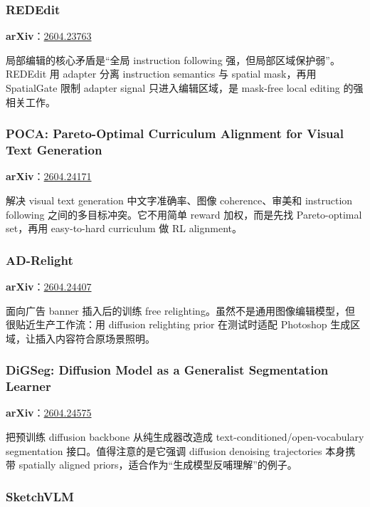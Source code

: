 \subsubsection{REDEdit}

\textbf{arXiv}：\href{https://arxiv.org/abs/2604.23763}{2604.23763}

局部编辑的核心矛盾是“全局 instruction following 强，但局部区域保护弱”。REDEdit 用 adapter 分离 instruction semantics 与 spatial mask，再用 SpatialGate 限制 adapter signal 只进入编辑区域，是 mask-free local editing 的强相关工作。

\subsubsection{POCA: Pareto-Optimal Curriculum Alignment for Visual Text Generation}

\textbf{arXiv}：\href{https://arxiv.org/abs/2604.24171}{2604.24171}

解决 visual text generation 中文字准确率、图像 coherence、审美和 instruction following 之间的多目标冲突。它不用简单 reward 加权，而是先找 Pareto-optimal set，再用 easy-to-hard curriculum 做 RL alignment。

\subsubsection{AD-Relight}

\textbf{arXiv}：\href{https://arxiv.org/abs/2604.24407}{2604.24407}

面向广告 banner 插入后的训练 free relighting。虽然不是通用图像编辑模型，但很贴近生产工作流：用 diffusion relighting prior 在测试时适配 Photoshop 生成区域，让插入内容符合原场景照明。

\subsubsection{DiGSeg: Diffusion Model as a Generalist Segmentation Learner}

\textbf{arXiv}：\href{https://arxiv.org/abs/2604.24575}{2604.24575}

把预训练 diffusion backbone 从纯生成器改造成 text-conditioned/open-vocabulary segmentation 接口。值得注意的是它强调 diffusion denoising trajectories 本身携带 spatially aligned priors，适合作为“生成模型反哺理解”的例子。

\subsubsection{SketchVLM}

